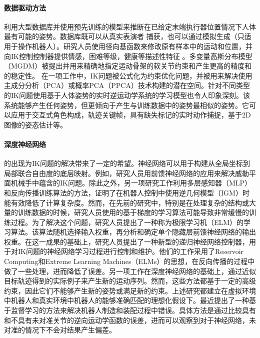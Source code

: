 \paragraph{数据驱动方法}利用大型数据库并使用预先训练的模型来推断在已给定末端执行器位置情况下人体最有可能的姿势。数据库既可以从真实表演者 \cite{huang2017multi}捕获，也可以通过模拟生成（只适用于操作机器人）\cite{rolf2010goal}。研究人员使用径向基函数来修改原有样本中的运动和位置，并向IK控制控制器提供情感，困难等级，健康等描述性特征 \cite{rose2001artist}。多变量高斯分布模型（MGDM）被提出并用来精确地指定运动骨架的软关节约束和产生更高的精度和的稳定性\cite{huang2017multi}。 在一项工作中，IK问题被公式化为约束优化问题，并被用来解决使用主成分分析（PCA）或概率PCA（PPCA）\cite{chai2005performance, carvalho2007interactive, raunhardt2009motion, tournier2009motion}技术构建的潜在空间。针对不同类型的IK问题使用基于人体姿势的实时逆运动学系统的学习模型\cite{grochow2004Style}也令人印象深刻。该系统能够产生任何姿势，但更倾向于产生与训练数据中的姿势最相似的姿势。它可以应用于交互式角色构成，轨迹关键帧，具有缺失标记的实时动作捕捉，基于2D图像的姿态估计等。

\paragraph{深度神经网络}的出现为IK问题的解决带来了一定的希望。神经网络可以用于构建从全局坐标到局部联合自由度的底层映射。例如，研究人员用前馈神经网络的应用来解决威勒平面机械手中蕴含的IK问题\cite{petru}。除此之外，另一项研究工作利用多层感知器（MLP）和反向传播训练算法的方法，证明了在机器人控制中使用逆几何模型（IGM）时能有效降低了计算复杂度\cite{daya2010applying}。然而，在先前的研究中，特别是在处理复杂的结构或大量的训练数据的时候，研究人员使用的基于梯度的学习算法可能导致非常缓慢的训练过程。为了解决这个问题，研究人员提出了一种称为极限学习机（ELM）的学习算法\cite{feng2012inverse}。该算法随机选择输入权重，再分析和确定单个隐藏层前馈神经网络的输出权重。在这一成果的基础上，研究人员提出了一种新型的递归神经网络控制器，用于对IK问题的神经网络学习过程进行控制和维护\cite{rene}。他们的工作采用了Reservoir Computing\cite{luko2009reservoir}和Extreme Learning Machines（ELMs）\cite{huang}的思想，在反向传播的过程中做了一些处理，进而降低了误差。另一项工作在深度神经网络的基础上，通过近似目标轨迹得到的实际例子来产生新的运动序列\cite{siden}。然而，这些方法都基于一定的高级约束，因此它们不能够产生新的姿势或满足新的约束。上述研究都建立在虚拟环境中机器人和真实环境中机器人的能够准确匹配的理想化假设下。最近提出了一种基于监督学习的方法来解决机器人制造和装配过程中错误\cite{csiszar2017solving}。具体方法是通过比较具有和不具有未对准关节的逆向运动学函数的误差，进而可以观察到对于神经网络，未对准的情况下不会对结果产生偏差。

